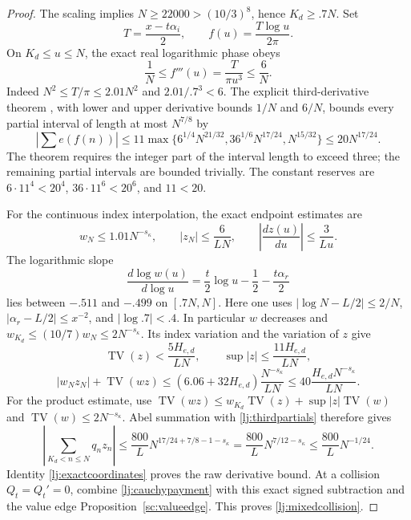 \documentclass[11pt]{article}
\numberwithin{equation}{section}
\theoremstyle{definition}
\theoremstyle{remark}
\begin{document}
\begin{proof}
The scaling implies \(N\ge22000>(10/3)^8\), hence \(K_d\ge.7N\).
Set
\[
 T=\frac{x-t\alpha_i}{2},\qquad f(u)=\frac{T\log u}{2\pi}.
\]
On \(K_d\le u\le N\), the exact real logarithmic phase obeys
\[
 \frac1N\le f'''(u)=\frac{T}{\pi u^3}\le\frac6N.
\]
Indeed \(N^2\le T/\pi\le2.01N^2\) and \(2.01/.7^3<6\).
The explicit third-derivative theorem
\cite[equation (2)]{arias}, with lower and upper derivative bounds
\(1/N\) and \(6/N\), bounds every partial interval of length at most
\(N^{7/8}\) by
\begin{equation}\label{lj:thirdpartials}
 \left|\sum e(f(n))\right|
 \le11\max\{6^{1/4}N^{21/32},
           36^{1/6}N^{17/24},N^{15/32}\}
 \le20N^{17/24}.
\end{equation}
The theorem requires the integer part of the interval length to exceed
three; the remaining partial intervals are bounded trivially.
The constant reserves are
\(6\cdot11^4<20^4\), \(36\cdot11^6<20^6\), and \(11<20\).

For the continuous index interpolation, the exact endpoint estimates are
\[
 w_N\le1.01N^{-s_\kappa},\qquad
 |z_N|\le\frac6{LN},\qquad
 \left|\frac{dz(u)}{du}\right|\le\frac3{Lu}.
\]
The logarithmic slope
\[
 \frac{d\log w(u)}{d\log u}
       =\frac t2\log u-\frac12-\frac{t\alpha_r}{2}
\]
lies between \(-.511\) and \(-.499\) on \([.7N,N]\).
Here one uses \(|\log N-L/2|\le2/N\),
\(|\alpha_r-L/2|\le x^{-2}\), and \(|\log .7|<.4\).
In particular \(w\) decreases and
\(w_{K_d}\le(10/7)w_N\le2N^{-s_\kappa}\). Its index variation and the
variation of \(z\) give
\[
 \operatorname{TV}(z)<\frac{5H_{e,d}}{LN},\qquad
 \sup|z|\le\frac{11H_{e,d}}{LN},
\]
\begin{equation}\label{lj:productvariation}
 |w_Nz_N|+\operatorname{TV}(wz)
 \le(6.06+32H_{e,d})\frac{N^{-s_\kappa}}{LN}
 \le40\frac{H_{e,d}N^{-s_\kappa}}{LN}.
\end{equation}
For the product estimate, use
\(\operatorname{TV}(wz)\le
 w_{K_d}\operatorname{TV}(z)+\sup|z|\operatorname{TV}(w)\)
and \(\operatorname{TV}(w)\le2N^{-s_\kappa}\).
Abel summation with \eqref{lj:thirdpartials} therefore gives
\[
 \left|\sum_{K_d<n\le N}q_nz_n\right|
 \le\frac{800}{L}N^{17/24+7/8-1-s_\kappa}
 =\frac{800}{L}N^{7/12-s_\kappa}
 \le\frac{800}{L}N^{-1/24}.
\]
Identity \eqref{lj:exactcoordinates} proves the raw derivative bound.
At a collision \(Q_t=Q_t'=0\), combine
\eqref{lj:cauchypayment} with this exact signed subtraction and the
value edge Proposition~\ref{sc:valueedge}. This proves
\eqref{lj:mixedcollision}.
\end{proof}
\end{document}
